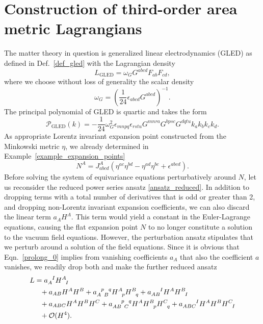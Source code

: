 \section{Construction of third-order area metric Lagrangians}\label{section_area_construction}
The matter theory in question is generalized linear electrodynamics (GLED) as defined in Def.~\ref{def_gled} with the Lagrangian density
\begin{equation*}
  L_\text{GLED} = \omega_G G^{abcd} F_{ab} F_{cd},
\end{equation*}
where we choose without loss of generality the scalar density
\begin{equation}\label{area_density}
  \omega_G = \left(\frac{1}{24}\epsilon_{abcd}G^{abcd}\right)^{-1}.
\end{equation}
The principal polynomial of GLED is quartic and takes the form
\begin{equation*}
  \mathcal P_\text{GLED}(k) = -\frac{1}{24} \omega_G^2 \epsilon_{mnpq} \epsilon_{rstu} G^{mnra} G^{bpsc} G^{dqtu} k_a k_b k_c k_d.
\end{equation*}
As appropriate Lorentz invariant expansion point constructed from the Minkowski metric $\eta$, we already determined in Example~\ref{example_expansion_points}
\begin{equation}\label{area_expansion_point}
  N^A = J_{abcd}^A (\eta^{ac} \eta^{bd} - \eta^{ad} \eta^{bc} + \epsilon^{abcd}).
\end{equation}
Before solving the system of equivariance equations perturbatively around $N$, let us reconsider the reduced power series ansatz \eqref{ansatz_reduced}. In addition to dropping terms with a total number of derivatives that is odd or greater than 2, and dropping non-Lorentz invariant expansion coefficients, we can also discard the linear term $a_A H^A$. This term would yield a constant in the Euler-Lagrange equations, causing the flat expansion point $N$ to no longer constitute a solution to the vacuum field equations. However, the perturbation ansatz stipulates that we perturb around a solution of the field equations. Since it is obvious that Eqn.\ \eqref{prolong_0} implies from vanishing coefficients $a_A$ that also the coefficient $a$ vanishes, we readily drop both and make the further reduced ansatz
\begin{equation}\label{ansatz_area_gravity}
  \begin{aligned}
    L &{} = a_A^{\hphantom AI} H^A_{\hphantom AI} \\
      &{} \hphantom{=} + a_{AB} H^A H^B + a_{A\hphantom pB}^{\hphantom Ap\hphantom Bq} H^A_{\hphantom Ap} H^B_{\hphantom Bq} + a_{AB}^{\hphantom{AB}I} H^A H^B_{\hphantom BI} \\
      &{} \hphantom{=} + a_{ABC} H^A H^B H^C + a_{AB\hphantom pC}^{\hphantom{AB}p\hphantom Cq} H^A H^B_{\hphantom Bp} H^C_{\hphantom Cq} + a_{ABC}^{\hphantom{ABC}I} H^A H^B H^C_{\hphantom CI} \\
      &{} \hphantom{=} + \mathcal O(H^4).
  \end{aligned}
\end{equation}

